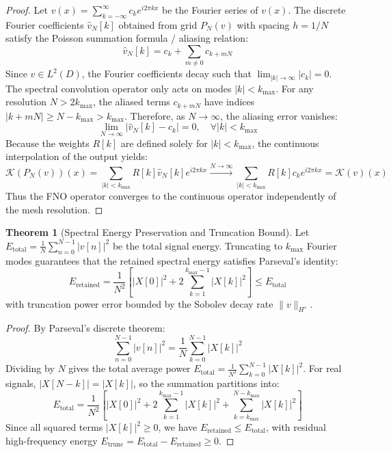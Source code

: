 \documentclass[11pt,a4paper]{article}
\theoremstyle{definition}
\newtheorem{theorem}{\textbf{Theorem}}[section]
\begin{document}
\begin{proof}
Let $v(x) = \sum_{k=-\infty}^\infty c_k e^{i 2\pi k x}$ be the Fourier series of $v(x)$.
The discrete Fourier coefficients $\hat{v}_N[k]$ obtained from grid $P_N(v)$ with spacing $h = 1/N$ satisfy the Poisson summation formula / aliasing relation:
{\boldmath
\begin{equation}
\hat{v}_N[k] = c_k + \sum_{m \neq 0} c_{k + m N}
\end{equation}
}
Since $v \in L^2(D)$, the Fourier coefficients decay such that $\lim_{|k| \to \infty} |c_k| = 0$.
The spectral convolution operator only acts on modes $|k| < k_{\max}$.
For any resolution $N > 2 k_{\max}$, the aliased terms $c_{k + mN}$ have indices $|k + mN| \ge N - k_{\max} > k_{\max}$.
Therefore, as $N \to \infty$, the aliasing error vanishes:
{\boldmath
\begin{equation}
\lim_{N \to \infty} |\hat{v}_N[k] - c_k| = 0, \quad \forall |k| < k_{\max}
\end{equation}
}
Because the weights $R[k]$ are defined solely for $|k| < k_{\max}$, the continuous interpolation of the output yields:
{\boldmath
\begin{equation}
\mathcal{K}(P_N(v))(x) = \sum_{|k| < k_{\max}} R[k] \hat{v}_N[k] e^{i 2\pi k x} \xrightarrow{N \to \infty} \sum_{|k| < k_{\max}} R[k] c_k e^{i 2\pi k x} = \mathcal{K}(v)(x)
\end{equation}
}
Thus the FNO operator converges to the continuous operator independently of the mesh resolution.
\end{proof}

\begin{theorem}[Spectral Energy Preservation and Truncation Bound]
Let $E_{\text{total}} = \frac{1}{N} \sum_{n=0}^{N-1} |v[n]|^2$ be the total signal energy. Truncating to $k_{\max}$ Fourier modes guarantees that the retained spectral energy satisfies Parseval's identity:
{\boldmath
\begin{equation}
E_{\text{retained}} = \frac{1}{N^2} \left[ |X[0]|^2 + 2 \sum_{k=1}^{k_{\max}-1} |X[k]|^2 \right] \le E_{\text{total}}
\end{equation}
}
with truncation power error bounded by the Sobolev decay rate $\|v\|_{H^s}$.
\end{theorem}

\begin{proof}
By Parseval's discrete theorem:
{\boldmath
\begin{equation}
\sum_{n=0}^{N-1} |v[n]|^2 = \frac{1}{N} \sum_{k=0}^{N-1} |X[k]|^2
\end{equation}
}
Dividing by $N$ gives the total average power $E_{\text{total}} = \frac{1}{N^2} \sum_{k=0}^{N-1} |X[k]|^2$.
For real signals, $|X[N-k]| = |X[k]|$, so the summation partitions into:
{\boldmath
\begin{equation}
E_{\text{total}} = \frac{1}{N^2} \left[ |X[0]|^2 + 2 \sum_{k=1}^{k_{\max}-1} |X[k]|^2 + \sum_{k=k_{\max}}^{N - k_{\max}} |X[k]|^2 \right]
\end{equation}
}
Since all squared terms $|X[k]|^2 \ge 0$, we have $E_{\text{retained}} \le E_{\text{total}}$, with residual high-frequency energy $E_{\text{trunc}} = E_{\text{total}} - E_{\text{retained}} \ge 0$.
\end{proof}
\end{document}
